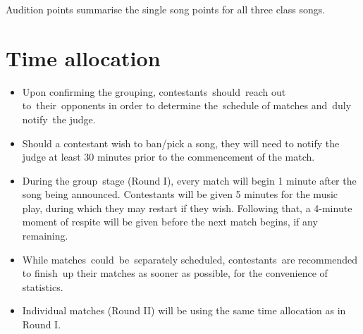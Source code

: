 \documentclass{article}
\begin{document}
Audition points summarise the single song points
for all three class songs.

\section{Time allocation}
\begin{itemize}
	\item Upon confirming the grouping,
	      contestants should reach out to their opponents
	      in order to determine the schedule of matches
	      and duly notify the judge.

	\item Should a contestant wish to ban/pick a song,
	      they will need to notify the judge at least 30 minutes
	      prior to the commencement of the match.

	\item During the group stage (Round I),
	      every match will begin 1 minute
	      after the song being announced.
	      Contestants will be given 5 minutes for the music play,
	      during which they may restart if they wish.
	      Following that, a 4-minute moment of respite will be given
	      before the next match begins, if any remaining.

	\item While matches could be separately scheduled,  %
	      contestants are recommended to finish up their matches
	      as sooner as possible,
	      for the convenience of statistics.  %

	\item Individual matches (Round II) will be using the same time allocation as in Round I.
\end{itemize}
\end{document}
